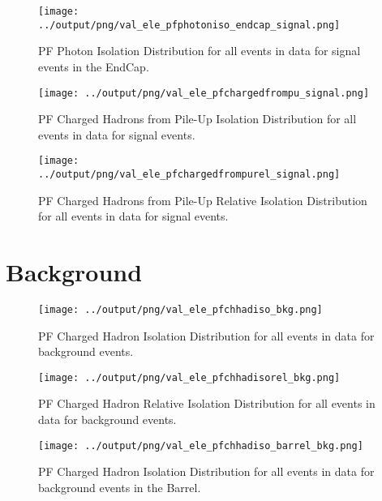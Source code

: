 \documentclass[11pt]{book}
\begin{document}
\begin{figure}[htb]
\centering
\texttt{[image: ../output/png/val\_ele\_pfphotoniso\_endcap\_signal.png]}
\caption{PF Photon Isolation Distribution for all events in data for signal events in the EndCap.}
\label{fig:val_ele_pfphotoniso_endcap_signal}
\end{figure}

\begin{figure}[htb]
\centering
\texttt{[image: ../output/png/val\_ele\_pfchargedfrompu\_signal.png]}
\caption{PF Charged Hadrons from Pile-Up Isolation Distribution for all events in data for signal events.}
\label{fig:val_ele_pfchargedfrompu_signal}
\end{figure}

\begin{figure}[htb]
\centering
\texttt{[image: ../output/png/val\_ele\_pfchargedfrompurel\_signal.png]}
\caption{PF Charged Hadrons from Pile-Up Relative Isolation Distribution for all events in data for signal events.}
\label{fig:val_ele_pfchargedfrompurel_signal}
\end{figure}

\clearpage





\section{Background}
\begin{figure}[htb]
\centering
\texttt{[image: ../output/png/val\_ele\_pfchhadiso\_bkg.png]}
\caption{PF Charged Hadron Isolation Distribution for all events in data for background events.}
\label{fig:val_ele_pfchhadiso_bkg}
\end{figure}

\begin{figure}[htb]
\centering
\texttt{[image: ../output/png/val\_ele\_pfchhadisorel\_bkg.png]}
\caption{PF Charged Hadron Relative Isolation Distribution for all events in data for background events.}
\label{fig:val_ele_pfchhadisorel_bkg}
\end{figure}

\begin{figure}[htb]
\centering
\texttt{[image: ../output/png/val\_ele\_pfchhadiso\_barrel\_bkg.png]}
\caption{PF Charged Hadron Isolation Distribution for all events in data for background events in the Barrel.}
\label{fig:val_ele_pfchhadiso_barrel_bkg}
\end{figure}
\end{document}
